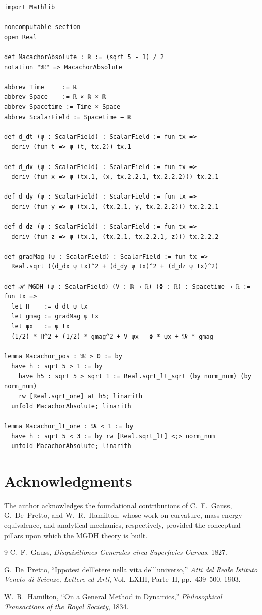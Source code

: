 \documentclass[11pt,a4paper]{article}
\theoremstyle{definition}
\theoremstyle{plain}
\begin{document}
\begin{verbatim}
import Mathlib

noncomputable section
open Real

def MacachorAbsolute : ℝ := (sqrt 5 - 1) / 2
notation "𝔐" => MacachorAbsolute

abbrev Time     := ℝ
abbrev Space    := ℝ × ℝ × ℝ
abbrev Spacetime := Time × Space
abbrev ScalarField := Spacetime → ℝ

def d_dt (ψ : ScalarField) : ScalarField := fun tx =>
  deriv (fun t => ψ (t, tx.2)) tx.1

def d_dx (ψ : ScalarField) : ScalarField := fun tx =>
  deriv (fun x => ψ (tx.1, (x, tx.2.2.1, tx.2.2.2))) tx.2.1

def d_dy (ψ : ScalarField) : ScalarField := fun tx =>
  deriv (fun y => ψ (tx.1, (tx.2.1, y, tx.2.2.2))) tx.2.2.1

def d_dz (ψ : ScalarField) : ScalarField := fun tx =>
  deriv (fun z => ψ (tx.1, (tx.2.1, tx.2.2.1, z))) tx.2.2.2

def gradMag (ψ : ScalarField) : ScalarField := fun tx =>
  Real.sqrt ((d_dx ψ tx)^2 + (d_dy ψ tx)^2 + (d_dz ψ tx)^2)

def ℋ_MGDH (ψ : ScalarField) (V : ℝ → ℝ) (Φ : ℝ) : Spacetime → ℝ := fun tx =>
  let Π    := d_dt ψ tx
  let gmag := gradMag ψ tx
  let ψx   := ψ tx
  (1/2) * Π^2 + (1/2) * gmag^2 + V ψx - Φ * ψx + 𝔐 * gmag

lemma Macachor_pos : 𝔐 > 0 := by
  have h : sqrt 5 > 1 := by
    have h5 : sqrt 5 > sqrt 1 := Real.sqrt_lt_sqrt (by norm_num) (by norm_num)
    rw [Real.sqrt_one] at h5; linarith
  unfold MacachorAbsolute; linarith

lemma Macachor_lt_one : 𝔐 < 1 := by
  have h : sqrt 5 < 3 := by rw [Real.sqrt_lt] <;> norm_num
  unfold MacachorAbsolute; linarith
\end{verbatim}

\section*{Acknowledgments}

The author acknowledges the foundational contributions of C.~F.~Gauss, G.~De~Pretto, and W.~R.~Hamilton, whose work on curvature, mass-energy equivalence, and analytical mechanics, respectively, provided the conceptual pillars upon which the MGDH theory is built.

\begin{thebibliography}{9}
C.~F.~Gauss, \textit{Disquisitiones Generales circa Superficies Curvas}, 1827.

G.~De~Pretto, ``Ippotesi dell'etere nella vita dell'universo,'' \textit{Atti del Reale Istituto Veneto di Scienze, Lettere ed Arti}, Vol.~LXIII, Parte~II, pp.~439--500, 1903.

W.~R.~Hamilton, ``On a General Method in Dynamics,'' \textit{Philosophical Transactions of the Royal Society}, 1834.
\end{thebibliography}
\end{document}
